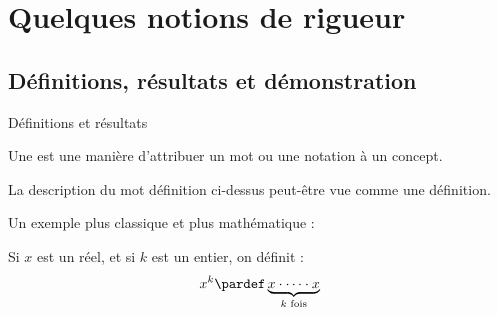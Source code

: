 \documentclass[french,xcolor=svgnames]{beamer}
\begin{document}
\section{Quelques notions de rigueur}
\subsection{Définitions, résultats et démonstration}

\begin{frame}{Définitions et résultats}
  \begin{definition}
    Une  est une manière d'attribuer un mot ou une notation à un concept.
  \end{definition}

  \begin{example}
    La description du mot \og définition\fg{} ci-dessus peut-être vue comme une définition.
  \end{example}\pause

  \begin{example}Un exemple plus classique et plus \og mathématique\fg{} :\pause{}
    \begin{definition}
      Si $x$ est un réel, et si $k$ est un entier, on définit :%
      \begin{equation*}
        x^{k} \pardef \underbrace{x \cdot \cdots \cdot x}_{\text{$k$ fois}}
      \end{equation*}
    \end{definition}
  \end{example}\pause
\end{frame}




\end{document}
